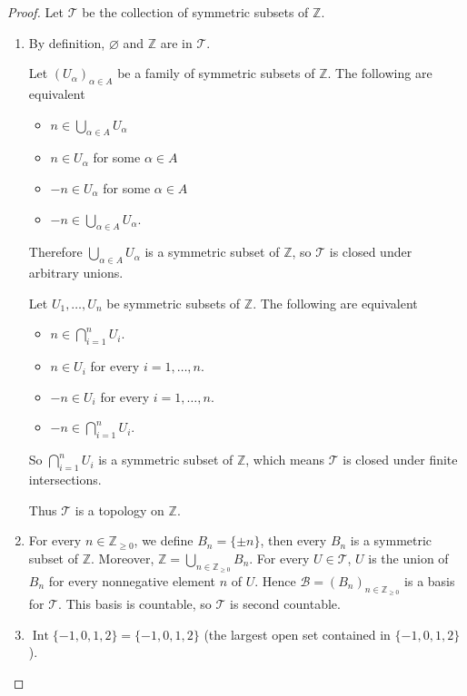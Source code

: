 \begin{proof}
	Let $\mathscr{T}$ be the collection of symmetric subsets of $\mathbb{Z}$.
	\begin{enumerate}[label={(\alph*)}]
		\item By definition, $\varnothing$ and $\mathbb{Z}$ are in $\mathscr{T}$.

		      Let ${(U_{\alpha})}_{\alpha\in A}$ be a family of symmetric subsets of $\mathbb{Z}$. The following are equivalent
		      \begin{itemize}
			      \item $n\in\bigcup_{\alpha\in A}U_{\alpha}$
			      \item $n\in U_{\alpha}$ for some $\alpha\in A$
			      \item $-n\in U_{\alpha}$ for some $\alpha\in A$
			      \item $-n\in\bigcup_{\alpha\in A}U_{\alpha}$.
		      \end{itemize}

		      Therefore $\bigcup_{\alpha\in A}U_{\alpha}$ is a symmetric subset of $\mathbb{Z}$, so $\mathscr{T}$ is closed under arbitrary unions.

		      Let $U_{1}, \ldots, U_{n}$ be symmetric subsets of $\mathbb{Z}$. The following are equivalent
		      \begin{itemize}
			      \item $n\in \bigcap^{n}_{i=1}U_{i}$.
			      \item $n\in U_{i}$ for every $i = 1,\ldots, n$.
			      \item $-n\in U_{i}$ for every $i = 1,\ldots, n$.
			      \item $-n\in \bigcap^{n}_{i=1}U_{i}$.
		      \end{itemize}

		      So $\bigcap^{n}_{i=1}U_{i}$ is a symmetric subset of $\mathbb{Z}$, which means $\mathscr{T}$ is closed under finite intersections.

		      Thus $\mathscr{T}$ is a topology on $\mathbb{Z}$.
		\item For every $n\in\mathbb{Z}_{\geq 0}$, we define $B_{n} = \{ \pm {n} \}$, then every $B_{n}$ is a symmetric subset of $\mathbb{Z}$. Moreover, $\mathbb{Z} = \bigcup_{n\in\mathbb{Z}_{\geq 0}}B_{n}$. For every $U\in\mathscr{T}$, $U$ is the union of $B_{n}$ for every nonnegative element $n$ of $U$. Hence $\mathscr{B} = {(B_{n})}_{n\in\mathbb{Z}_{\geq 0}}$ is a basis for $\mathscr{T}$. This basis is countable, so $\mathscr{T}$ is second countable.
		\item $\operatorname{Int}\{ -1, 0, 1, 2 \} = \{ -1, 0, 1, 2 \}$ (the largest open set contained in $\{ -1, 0, 1, 2 \}$).


\end{enumerate}
\end{proof}
